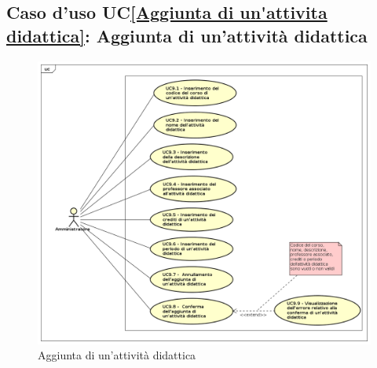 \subsection{Caso d'uso UC\ref{Aggiunta di un'attivita didattica}: Aggiunta di un'attività didattica}
\begin{figure} [H]
	\centering
	\includegraphics[scale=0.45]{./img/UseCaseDiagram09.png}
	\caption{Aggiunta di un'attività didattica}\label{}
\end{figure}
